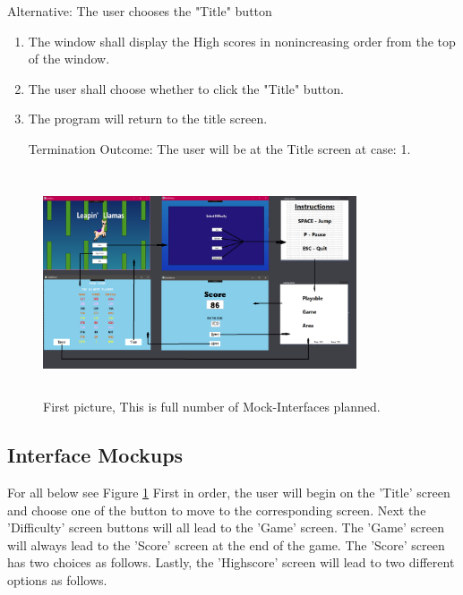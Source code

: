 \documentclass[10pt,conference,onecolumn,compsoc]{IEEEtran}
\begin{document}
Alternative: The user chooses the "Title" button
\begin{enumerate}
\item The window shall display the High scores in nonincreasing order from the top of the window.
\item The user shall choose whether to click the "Title" button.
\item The program will return to the title screen.
\item[Termination Outcome:] The user will be at the Title screen at case: 1. 
\end{enumerate}

\begin{figure}[ht!]
\includegraphics[height=250px, width=350px]{Mockup.png}
\caption{First picture, This is full number of Mock-Interfaces planned.}
\label{fig:mockup}
\end{figure}



\subsection{Interface Mockups}
For all below see Figure \ref{fig:mockup}
First in order, the user will begin on the 'Title' screen and choose one of the button to move to the corresponding screen. Next the 'Difficulty' screen buttons will all lead to the 'Game' screen. The 'Game' screen will always lead to the 'Score' screen at the end of the game. The 'Score' screen has two choices as follows. Lastly, the 'Highscore' screen will lead to two different options as follows.
\end{document}
